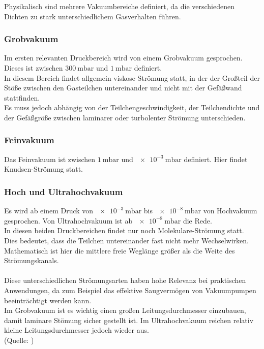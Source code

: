 			\noindent
		Physikalisch sind mehrere Vakuumbereiche definiert, da die verschiedenen Dichten zu stark unterschiedlichem Gasverhalten führen. 

		\subsubsection{Grobvakuum}
			\noindent
			Im ersten relevanten Druckbereich wird von einem Grobvakuum gesprochen. Dieses ist zwischen $\SI{300}{\milli\bar}$ und $\SI{1}{\milli\bar}$ definiert.\\
			In diesem Bereich findet allgemein viskose Strömung statt, in der der Großteil der Stöße zwischen den Gasteilchen untereinander und nicht mit der Gefäßwand stattfinden.\\
			Es muss jedoch abhängig von der Teilchengeschwindigkeit, der Teilchendichte und der Gefäßgröße zwischen laminarer oder turbolenter Strömung unterschieden. 

		\subsubsection{Feinvakuum}

			\noindent
			Das Feinvakuum ist zwischen $\SI{1}{\milli\bar}$ und $\SI{e-3}{\milli\bar}$ definiert. Hier findet Knudsen-Strömung statt.

			\noindent
		\subsubsection{Hoch und Ultrahochvakuum} 
			Es wird ab einem Druck von $\SI{e-3}{\milli\bar}$ bis $\SI{e-8}{\milli\bar}$ von Hochvakuum gesprochen. Von Ultrahochvakuum ist ab $\SI{e-8}{\milli\bar}$ die Rede.	\\	
			In diesen beiden Druckbereichen findet nur noch Molekulare-Strömung statt.\\
			Dies bedeutet, dass die Teilchen untereinander fast nicht mehr Wechselwirken. Mathematisch ist hier die mittlere freie Weglänge größer als die Weite des Strömungskanals.
		\\
		\\
		Diese unterschiedlichen Strömungsarten haben hohe Relevanz bei praktischen Anwendungen, da zum Beispiel das effektive Saugvermögen von Vakuumpumpen beeinträchtigt werden kann.\\
		Im Grobvakuum ist es wichtig einen großen Leitungsdurchmesser einzubauen, damit laminare Stömung sicher gestellt ist.
		Im Ultrahochvakuum reichen relativ kleine Leitungsdurchmesser jedoch wieder aus.\\
		(Quelle: \cite{pfeiffer:grund})

